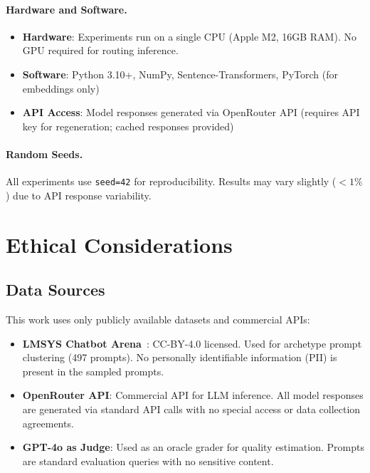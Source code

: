 \paragraph{Hardware and Software.}
\begin{itemize}[leftmargin=*]
    \item \textbf{Hardware}: Experiments run on a single CPU (Apple M2, 16GB RAM). No GPU required for routing inference.
    \item \textbf{Software}: Python 3.10+, NumPy, Sentence-Transformers, PyTorch (for embeddings only)
    \item \textbf{API Access}: Model responses generated via OpenRouter API (requires API key for regeneration; cached responses provided)
\end{itemize}

\paragraph{Random Seeds.}
All experiments use \texttt{seed=42} for reproducibility. Results may vary slightly ($<1\%$) due to API response variability.


\section{Ethical Considerations}
\label{app:ethics}

\subsection{Data Sources}

This work uses only publicly available datasets and commercial APIs:

\begin{itemize}[leftmargin=*]
    \item \textbf{LMSYS Chatbot Arena}~\cite{zheng2023judging}: CC-BY-4.0 licensed. Used for archetype prompt clustering (497 prompts). No personally identifiable information (PII) is present in the sampled prompts.
    
    \item \textbf{OpenRouter API}: Commercial API for LLM inference. All model responses are generated via standard API calls with no special access or data collection agreements.
    
    \item \textbf{GPT-4o as Judge}: Used as an oracle grader for quality estimation. Prompts are standard evaluation queries with no sensitive content.
\end{itemize}

